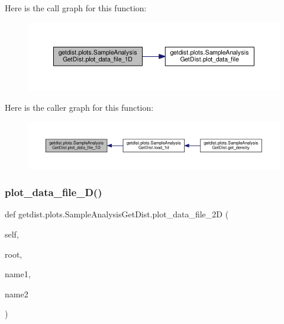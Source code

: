 Here is the call graph for this function\+:
\nopagebreak
\begin{figure}[H]
\begin{center}
\leavevmode
\includegraphics[width=350pt]{classgetdist_1_1plots_1_1SampleAnalysisGetDist_ad510e8bf6d05a25a2da3f5770e5c530f_cgraph}
\end{center}
\end{figure}
Here is the caller graph for this function\+:
\nopagebreak
\begin{figure}[H]
\begin{center}
\leavevmode
\includegraphics[width=350pt]{classgetdist_1_1plots_1_1SampleAnalysisGetDist_ad510e8bf6d05a25a2da3f5770e5c530f_icgraph}
\end{center}
\end{figure}
\mbox{\label{classgetdist_1_1plots_1_1SampleAnalysisGetDist_abca4dbc19b7d18f4b4bc421e38a9a6d3}} 
\subsubsection{\texorpdfstring{plot\+\_\+data\+\_\+file\+\_\+D()}{plot\_data\_file\_2D()}}
{\footnotesize\ttfamily def getdist.\+plots.\+Sample\+Analysis\+Get\+Dist.\+plot\+\_\+data\+\_\+file\+\_\+2D (\begin{DoxyParamCaption}\item[{}]{self,  }\item[{}]{root,  }\item[{}]{name1,  }\item[{}]{name2 }\end{DoxyParamCaption})}



